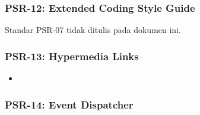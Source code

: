 \subsubsection{PSR-12: Extended Coding Style Guide}
\label{subsubsec:psr12}
Standar PSR-07 tidak ditulis pada dokumen ini.


\subsubsection{PSR-13: Hypermedia Links}
\label{subsubsec:psr13}
\begin{itemize}
	\item 
\end{itemize}


\subsubsection{PSR-14: Event Dispatcher}
\label{subsubsec:psr14}
